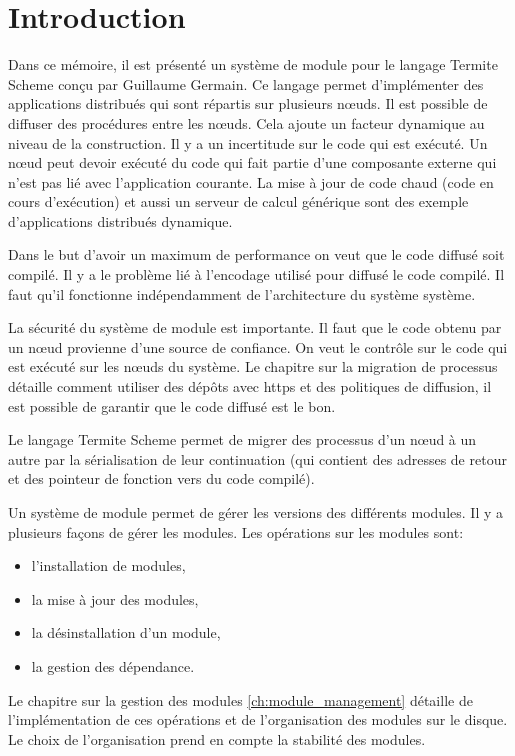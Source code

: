 \chapter*{Introduction}


Dans ce mémoire, il est présenté un système de module pour le langage Termite
Scheme conçu par Guillaume Germain. Ce langage permet d'implémenter des
applications distribués qui sont répartis sur plusieurs nœuds. Il est possible
de diffuser des procédures entre les nœuds. Cela ajoute un facteur dynamique au
niveau de la construction.  Il y a un incertitude sur le code qui est exécuté.
Un nœud peut devoir exécuté du code qui fait partie d'une composante externe
qui n'est pas lié avec l'application courante.  La mise à jour de code chaud
(code en cours d'exécution) et aussi un serveur de calcul générique sont des
exemple d'applications distribués dynamique.

Dans le but d'avoir un maximum de performance on veut que le code diffusé soit
compilé. Il y a le problème lié à l'encodage utilisé pour diffusé le code
compilé. Il faut qu'il fonctionne indépendamment de l'architecture du système
système.

La sécurité du système de module est importante. Il faut que le code obtenu par
un nœud provienne d'une source de confiance. On veut le contrôle sur le code
qui est exécuté sur les nœuds du système. Le chapitre sur la migration
de processus détaille comment utiliser des dépôts avec https et des politiques
de diffusion, il est possible de garantir que le code diffusé est le bon.

Le langage Termite Scheme permet de migrer des processus d'un nœud à un autre
par la sérialisation de leur continuation (qui contient des adresses de retour
et des pointeur de fonction vers du code compilé).

Un système de module permet de gérer les versions des différents modules.
Il y a plusieurs façons de gérer les modules.
Les opérations sur les modules sont:
\begin{itemize}
  \item l'installation de modules,
  \item la mise à jour des modules,
  \item la désinstallation d'un module,
  \item la gestion des dépendance.
\end{itemize}
Le chapitre sur la gestion des modules \ref{ch:module_management}
détaille de l'implémentation de ces opérations et de l'organisation
des modules sur le disque. Le choix de l'organisation prend en compte
la stabilité des modules.

